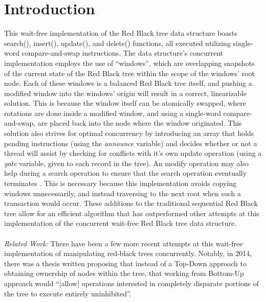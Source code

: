 \documentclass[letterpaper, 10 pt, conference]{ieeeconf}  %
\begin{document}
	\section{Introduction}
	This wait-free implementation of the Red Black tree data structure boasts search(), insert(), update(), and delete() functions, all executed utilizing single-word compare-and-swap instructions. The data structure's concurrent implementation employs the use of ``windows'', which are overlapping snapshots of the current state of the Red Black tree within the scope of the windows' root node. Each of these windows is a balanced Red Black tree itself, and pushing a modified window into the windows' origin will result in a correct, linearizable solution. This is because the window itself can be atomically swapped, where rotations are done inside a modified window, and using a single-word compare-and-swap, are placed back into the node where the window originated. This solution also strives for optimal concurrency by introducing an array that holds pending instructions (using the \textit{announce} variable) and decides whether or not a thread will assist by checking for conflicts with it's own update operation (using a \textit{gate} variable, given to each record in the tree). An modify operation may also help during a search operation to ensure that the search operation eventually terminates \cite{RedBlackDoc}. This is necessary because this implementation avoids copying windows unnecessarily, and instead traversing to the next root when such a transaction would occur. These additions to the traditional sequential Red Black tree allow for an efficient algorithm that has outperformed other attempts at this implementation of the concurrent wait-free Red Black tree data structure. \\ \\
	\textit{Related Work: } There have been a few more recent attempts at this wait-free implementation of manipulating red-black trees concurrently. Notably, in 2014, there was a thesis written proposing that instead of a Top-Down approach to obtaining ownership of nodes within the tree, that working from Bottom-Up approach would ``[allow] operations interested in completely disparate portions of the tree to execute entirely uninhibited''\cite{BottomUpRBD}.
	
\end{document}

